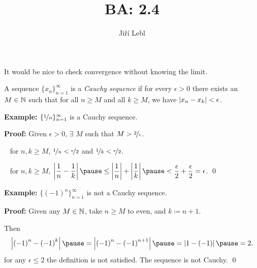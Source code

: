 \documentclass[10pt,aspectratio=169]{beamer}
\author{Ji\v{r}\'i Lebl}
\institute[OSU]{%
Departemento pri Matematiko de Oklahoma {\^S}tata Universitato}
\title{BA: 2.4}
\date{}
\begin{document}
\begin{frame}
\titlepage
\end{frame}

\begin{frame}
It would be nice to check convergence without knowing the limit.

\pause

\begin{definition}
A sequence $\{ x_n \}_{n=1}^\infty$ is a \emph{Cauchy sequence}
if for every $\epsilon > 0$ there exists an $M \in {\mathbb{N}}$ such that
for all $n \geq M$ and all $k \geq M$, we have
\quad
$\left\lvert {x_n - x_k} \right\rvert < \epsilon$.
\end{definition}

\pause

\textbf{Example:}
$\{ \nicefrac{1}{n} \}_{n=1}^{\infty}$ is a Cauchy sequence.

\medskip
\pause

\textbf{Proof:}  Given $\epsilon > 0$, $\exists$ $M$ such that
$M > \nicefrac{2}{\epsilon}$.

\pause
\thus~ for $n,k \geq M$, \quad
$\nicefrac{1}{n} < \nicefrac{\epsilon}{2}$
and
$\nicefrac{1}{k} < \nicefrac{\epsilon}{2}$.

\pause
\medskip

\thus ~ for $n, k \geq M$, \quad
$\displaystyle \abs{\frac{1}{n} - \frac{1}{k}}
\pause
\leq
\abs{\frac{1}{n}} + \abs{\frac{1}{k}}
\pause
< \frac{\epsilon}{2} + \frac{\epsilon}{2} = \epsilon$. \qed

\pause
\medskip

\textbf{Example:}
$\bigl\{ {(-1)}^n \bigr\}_{n=1}^\infty$ is not a Cauchy sequence.

\medskip
\pause

\textbf{Proof:}
Given any $M \in {\mathbb{N}}$, take $n \geq M$ to even, and $k \coloneqq n+1$.

\pause
Then
\[
\abs{{(-1)}^n - {(-1)}^k}
\pause
=
\abs{{(-1)}^n - {(-1)}^{n+1}}
\pause
=
\abs{1 - (-1)}
\pause
= 2 .
\]
\pause
\thus
\quad for any $\epsilon \leq 2$ the definition is not satisfied.
%
%
\pause
\quad
\thus \quad The sequence is not Cauchy. \qed

\end{frame}
\end{document}
